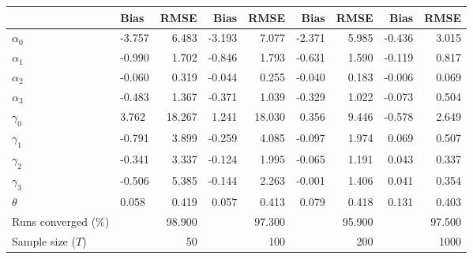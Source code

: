
\begin{tabular}[t]{llrrrrrrr}
\toprule
  & Bias & RMSE & Bias & RMSE & Bias & RMSE & Bias & RMSE\\
\midrule
$\alpha_{0}$ & -3.757 & 6.483 & -3.193 & 7.077 & -2.371 & 5.985 & -0.436 & 3.015\\
$\alpha_{1}$ & -0.990 & 1.702 & -0.846 & 1.793 & -0.631 & 1.590 & -0.119 & 0.817\\
$\alpha_{2}$ & -0.060 & 0.319 & -0.044 & 0.255 & -0.040 & 0.183 & -0.006 & 0.069\\
$\alpha_{3}$ & -0.483 & 1.367 & -0.371 & 1.039 & -0.329 & 1.022 & -0.073 & 0.504\\
$\gamma_{0}$ & 3.762 & 18.267 & 1.241 & 18.030 & 0.356 & 9.446 & -0.578 & 2.649\\
$\gamma_{1}$ & -0.791 & 3.899 & -0.259 & 4.085 & -0.097 & 1.974 & 0.069 & 0.507\\
$\gamma_{2}$ & -0.341 & 3.337 & -0.124 & 1.995 & -0.065 & 1.191 & 0.043 & 0.337\\
$\gamma_{3}$ & -0.506 & 5.385 & -0.144 & 2.263 & -0.001 & 1.406 & 0.041 & 0.354\\
$\theta$ & 0.058 & 0.419 & 0.057 & 0.413 & 0.079 & 0.418 & 0.131 & 0.403\\
Runs converged (\%) &  & 98.900 &  & 97.300 &  & 95.900 &  & 97.500\\
Sample size ($T$) &  & 50 &  & 100 &  & 200 &  & 1000\\
\bottomrule
\end{tabular}

